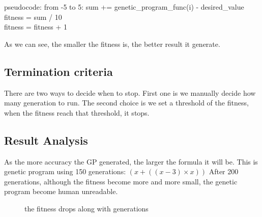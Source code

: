 \documentclass[11pt, a4paper, oneside, openright]{article}
\begin{document}
\begin{program}
\mbox{pseudocode:}
\hspace *{4cm} \FOR \hspace*{2mm} from \hspace*{2mm}-5\hspace*{2mm} to\hspace*{2mm} 5:
		sum += genetic\_program\_func(i)  - desired\_value
		fitness = sum / 10
 \\%
	fitness =  fitness + 1
\end{program}
As we can see, the smaller the fitness is, the better result it generate.

\subsection{Termination criteria}
There are two ways to decide when to stop.
First one is we manually decide how many generation to run. The second choice is we set a threshold of the fitness, when the fitness reach that threshold, it stops.

\subsection{Result Analysis}
As the more accuracy the GP generated, the larger the formula it will be. 
This is genetic program using 150 generations:
\newline \hspace * {5cm} $(x + ((x - 3) \times x))$
\newline After 200 generations, although the fitness become more and more small, the genetic program become human unreadable.
  \begin{figure}[!ht]
  \centerline{}
  \caption{ the fitness drops along with generations}
  \label{fig:generations}
  \end{figure}
 
\end{document}

